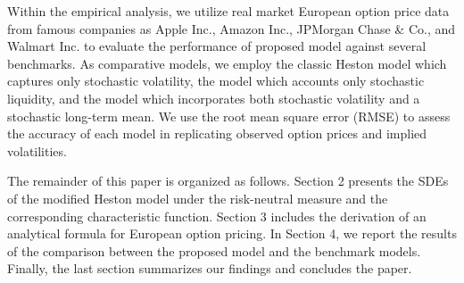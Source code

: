 \documentclass[twoside]{article}
\begin{document}
\noindent
Within the empirical analysis, we utilize real market European option price data from famous companies as Apple Inc., Amazon Inc., JPMorgan Chase \& Co., 
and Walmart Inc. to evaluate the performance of proposed model against several benchmarks. As comparative models, we employ the classic Heston model 
which captures only stochastic volatility, the model which accounts only stochastic liquidity, and the model which incorporates both stochastic volatility and a 
stochastic long-term mean. We use the root mean square error (RMSE) to assess the accuracy of each model in replicating observed option prices and implied
volatilities.

\noindent
The remainder of this paper is organized as follows. Section 2 presents the SDEs of the modified Heston model under the risk-neutral measure and the 
corresponding characteristic function. Section 3 includes the derivation of an analytical formula for European option pricing. In Section 4, we report the 
results of the comparison between the proposed model and the benchmark models. Finally, the last section summarizes our findings and concludes the paper.

\end{document}
